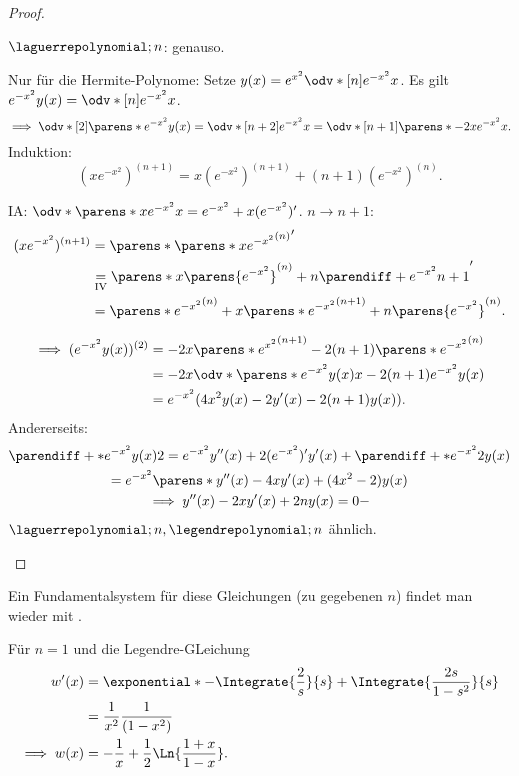 \begin{proof}
\begin{proofdescription}
    \( \laguerrepolynomial;{n} \): genauso.
    \item[\ordinalnum{2} \Beh] Nur für die Hermite-Polynome: Setze \( y(x)=e^{x^2}\odv*[n]{e^{-x^2}}{x} \). Es gilt \( e^{-x^2}y(x)=\odv*[n]{e^{-x^2}}{x} \).
    \begin{equation*}
      \implies \odv*[2]{\parens*{e^{-x^2}y(x)}}=\odv*[n+2]{e^{-x^2}}{x}=\odv*[n+1]{\parens*{-2xe^{-x^2}}}{x}.
    \end{equation*}
    Induktion:
    \begin{equation*}
      (xe^{-x^2})^{(n+1)}=x(e^{-x^2})^{(n+1)}+(n+1)(e^{-x^2})^{(n)}.
    \end{equation*}
    \begin{subproof}
      IA\@: \( \odv*{\parens*{xe^{-x^2}}}{x}=e^{-x^2}+x(e^{-x^2})' \).
      \( n\to n+1 \):
      \begin{align*}
        (xe^{-x^2})^{(n+1)}&=\parens*{\parens*{xe^{-x^2}}^{(n)}}'\\
        &\underset{\text{IV}}{=}\parens*{x\parens{e^{-x^2}}^{(n)}+n\parendiff+{e^{-x^2}}{n+1}}'\\
        &=\parens*{e^{-x^2}}^{(n)}+x\parens*{e^{-x^2}}^{(n+1)}+n\parens{e^{-x^2}}^{(n)}.
      \end{align*}
    \end{subproof}
    \begin{align*}
      \implies (e^{-x^2}y(x))^{(2)}&=-2x\parens*{e^{x^2}}^{(n+1)}-2(n+1)\parens*{e^{-x^2}}^{(n)}\\
      &=-2x\odv*{\parens*{e^{-x^2}y(x)}}{x}-2(n+1)e^{-x^2}y(x)\\
      &=e^{-x^2}(4x^2y(x)-2y'(x)-2(n+1)y(x)).
    \end{align*}
    Andererseits:
    \begin{gather*}
      \parendiff+*{e^{-x^2}y(x)}{2}=e^{-x^2}y''(x)+2(e^{-x^2})'y'(x)+\parendiff+*{e^{-x^2}}{2}y(x)\\
      =e^{-x^2}\parens*{y''(x)-4xy'(x)+(4x^2-2)y(x)}\\
      \implies y''(x)-2xy'(x)+2ny(x)=0-
    \end{gather*}
    \( \laguerrepolynomial;{n},\legendrepolynomial;{n} \) ähnlich.
  \end{proofdescription}  
\end{proof}
Ein Fundamentalsystem für diese Gleichungen (zu gegebenen \( n \)) findet man \zb wieder mit .

\begin{beispiel*}
  Für \( n=1 \) und die Legendre-GLeichung
  \begin{align*}
    w'(x)&=\exponential*{-\Integrate{\frac{2}{s}}{s}+\Integrate{\frac{2s}{1-s^2}}{s}}\\
    &=\frac{1}{x^2}\frac{1}{(1-x^2)}\\
    \implies w(x)&=-\frac{1}{x}+\frac{1}{2}\Ln{\frac{1+x}{1-x}}.
  \end{align*}
\end{beispiel*}